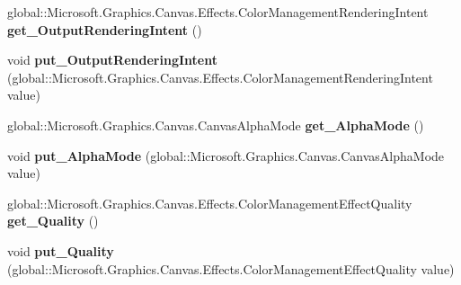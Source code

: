 \begin{DoxyCompactItemize}
\item 
\mbox{\label{class_microsoft_1_1_graphics_1_1_canvas_1_1_effects_1_1_color_management_effect_ab3f873d532a7ac2daad8c8891c039b7b}} 
global\+::\+Microsoft.\+Graphics.\+Canvas.\+Effects.\+Color\+Management\+Rendering\+Intent {\bfseries get\+\_\+\+Output\+Rendering\+Intent} ()
\item 
\mbox{\label{class_microsoft_1_1_graphics_1_1_canvas_1_1_effects_1_1_color_management_effect_a18c1f342b105332ae8a95cb11dcba930}} 
void {\bfseries put\+\_\+\+Output\+Rendering\+Intent} (global\+::\+Microsoft.\+Graphics.\+Canvas.\+Effects.\+Color\+Management\+Rendering\+Intent value)
\item 
\mbox{\label{class_microsoft_1_1_graphics_1_1_canvas_1_1_effects_1_1_color_management_effect_a8345f14c6facbde7cb0800f962ecaa00}} 
global\+::\+Microsoft.\+Graphics.\+Canvas.\+Canvas\+Alpha\+Mode {\bfseries get\+\_\+\+Alpha\+Mode} ()
\item 
\mbox{\label{class_microsoft_1_1_graphics_1_1_canvas_1_1_effects_1_1_color_management_effect_a09ffed53f704cbca9f184fd3d5872f77}} 
void {\bfseries put\+\_\+\+Alpha\+Mode} (global\+::\+Microsoft.\+Graphics.\+Canvas.\+Canvas\+Alpha\+Mode value)
\item 
\mbox{\label{class_microsoft_1_1_graphics_1_1_canvas_1_1_effects_1_1_color_management_effect_a74e8b9b83a4d172f56e20953dd051a26}} 
global\+::\+Microsoft.\+Graphics.\+Canvas.\+Effects.\+Color\+Management\+Effect\+Quality {\bfseries get\+\_\+\+Quality} ()
\item 
\mbox{\label{class_microsoft_1_1_graphics_1_1_canvas_1_1_effects_1_1_color_management_effect_a4316f7588b101afd626da8698742b520}} 
void {\bfseries put\+\_\+\+Quality} (global\+::\+Microsoft.\+Graphics.\+Canvas.\+Effects.\+Color\+Management\+Effect\+Quality value)
\item 

\end{DoxyCompactItemize}
